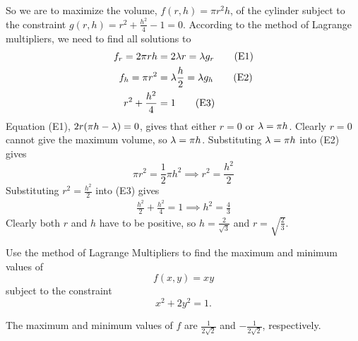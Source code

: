 \begin{solution}
So we are to maximize the volume, $f(r,h) = \pi r^2 h$, of the cylinder
subject to the constraint $g(r,h) = r^2+ \frac{h^2}{4} -1=0$.
According to the method of Lagrange multipliers, we need to find 
all solutions to
\begin{align*}
f_r = 2\pi r h &=2 \lambda r = \lambda g_r \tag{E1} \\ 
f_h = \pi r^2 &= \lambda \frac{h}{2} = \lambda g_h \tag{E2} \\ 
r^2+ \frac{h^2}{4}&=1 \tag{E3}
\end{align*}
Equation (E1), $2r(\pi h-\lambda)=0$, gives that either $r=0$ or $\lambda=\pi h$. 
Clearly $r=0$ cannot give the maximum volume, so $\lambda=\pi h$.
Substituting $\lambda=\pi h$ into (E2) gives
\begin{equation*}
\pi r^2 = \frac{1}{2}\pi h^2
\implies r^2=\frac{h^2}{2}
\end{equation*}
Substituting $r^2=\frac{h^2}{2}$ into (E3) gives
\begin{align*}
\frac{h^2}{2} + \frac{h^2}{4} =1
\implies h^2 =\frac{4}{3}
\end{align*}
Clearly both $r$ and $h$ have to be positive, so $h=\frac{2}{\sqrt{3}}$
and $r=\sqrt{\frac{2}{3}}$.
\end{solution}


\begin{question}[M200 2006D] %
Use the method of Lagrange Multipliers to find the maximum
and minimum values of
\begin{equation*}
f(x, y) = xy
\end{equation*}
subject to the constraint
\begin{equation*}
x^2 + 2y^2 = 1.
\end{equation*}
\end{question}

%

\begin{answer}
The maximum and minimum values of $f$ are $\frac{1}{2\sqrt{2}}$
and $-\frac{1}{2\sqrt{2}}$, respectively.
\end{answer}

